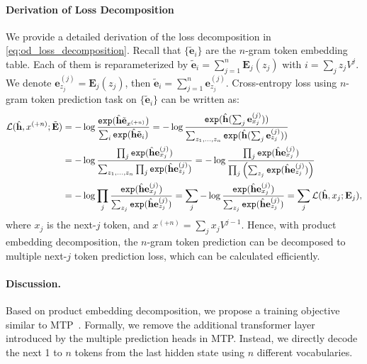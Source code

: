 \paragraph{Derivation of Loss Decomposition}
We provide a detailed derivation of the loss decomposition in \eqref{eq:od_loss_decomposition}. Recall that $\{\tilde{\mathbf{e}}_i\}$ are the $n$-gram token embedding table. Each of them is reparameterized by $\tilde{\mathbf{e}}_i=\sum_{j=1}^n\mathbf{E}_j(z_{j})$ with $i=\sum_jz_jV^j$. We denote $\mathbf{e}_{z_j}^{(j)}=\mathbf{E}_j(z_{j})$, then $\tilde{\mathbf{e}}_i=\sum_{j=1}^n\mathbf{e}_{z_j}^{(j)}$. Cross-entropy loss using $n$-gram token prediction task on $\{\tilde{\mathbf{e}}_i\}$ can be written as:
\begin{align}
    \mathcal{L}(\hat{\mathbf{h}},x^{(+n)};\tilde{\mathbf{E}}) &=-\log{ 
        \frac{\texttt{exp}(\hat{\mathbf{h}}\tilde{\mathbf{e}}_{x^{(+n)}})}
            {\sum_i\texttt{exp}(\hat{\mathbf{h}}\tilde{\mathbf{e}}_{i})}
        }
        = -\log{ 
        \frac{\texttt{exp}(\hat{\mathbf{h}}(\sum_j\mathbf{e}_{x_j}^{(j)}))}
            {\sum_{z_1,\dots,z_n}\texttt{exp}(\hat{\mathbf{h}}(\sum_j\mathbf{e}_{z_{j}}^{(j)}))}
        } \notag \\
        &= -\log{ 
        \frac{\prod_j \texttt{exp}(\hat{\mathbf{h}}\mathbf{e}_{x_j}^{(j)})}
            {\sum_{z_1,\dots,z_n}\prod_j\texttt{exp}(\hat{\mathbf{h}}\mathbf{e}_{z_{j}}^{(j)})}
        } = -\log{ 
        \frac{\prod_j \texttt{exp}(\hat{\mathbf{h}}\mathbf{e}_{x_j}^{(j)})}
            {\prod_j\left(\sum_{z_j}\texttt{exp}(\hat{\mathbf{h}}\mathbf{e}_{z_{j}}^{(j)})\right)}
        } \notag \\
        &= -\log{ 
            \prod_j\frac{ \texttt{exp}(\hat{\mathbf{h}}\mathbf{e}_{x_j}^{(j)})}
            {\sum_{z_j}\texttt{exp}(\hat{\mathbf{h}}\mathbf{e}_{z_{j}}^{(j)})}
        }= \sum_j-\log{ 
            \frac{ \texttt{exp}(\hat{\mathbf{h}}\mathbf{e}_{x_j}^{(j)})}
            {\sum_{z_j}\texttt{exp}(\hat{\mathbf{h}}\mathbf{e}_{z_{j}}^{(j)})}
        } =\sum_j\mathcal{L}(\hat{\mathbf{h}},x_j; \mathbf{E}_j),
\end{align}
where $x_j$ is the next-$j$ token, and $x^{(+n)}=\sum_jx_jV^{j-1}$. Hence, with product embedding decomposition, the $n$-gram token prediction can be decomposed to multiple next-$j$ token prediction loss, which can be calculated efficiently.


\paragraph{Discussion.} Based on product embedding decomposition, we propose a training objective similar to MTP~\cite{gloeckle2024better}. Formally, we remove the additional transformer layer introduced by the multiple prediction heads in MTP. Instead, we directly decode the next 1 to $n$ tokens from the last hidden state using $n$ different vocabularies. 

